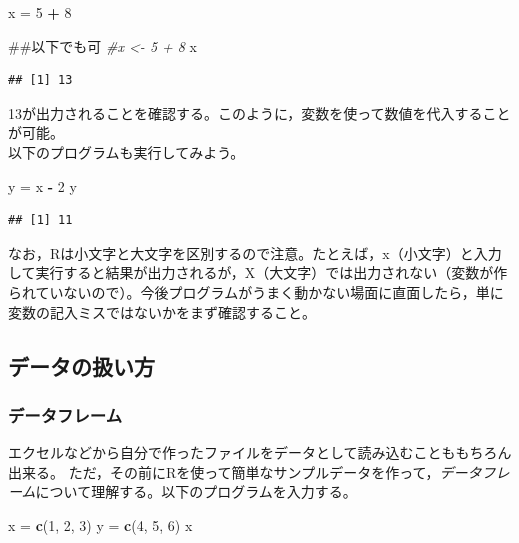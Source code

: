 \documentclass[]{article}
\newenvironment{Shaded}{\begin{snugshade}}{\end{snugshade}}
\newcommand{\KeywordTok}[1]{\textcolor[rgb]{0.13,0.29,0.53}{\textbf{#1}}}
\newcommand{\DecValTok}[1]{\textcolor[rgb]{0.00,0.00,0.81}{#1}}
\newcommand{\StringTok}[1]{\textcolor[rgb]{0.31,0.60,0.02}{#1}}
\newcommand{\CommentTok}[1]{\textcolor[rgb]{0.56,0.35,0.01}{\textit{#1}}}
\newcommand{\OperatorTok}[1]{\textcolor[rgb]{0.81,0.36,0.00}{\textbf{#1}}}
\newcommand{\NormalTok}[1]{#1}
\begin{document}
\begin{Shaded}
\begin{Highlighting}[]
\NormalTok{x =}\StringTok{ }\DecValTok{5} \OperatorTok{+}\StringTok{ }\DecValTok{8}

\NormalTok{##以下でも可}
\CommentTok{#x <- 5 + 8}
\NormalTok{x}
\end{Highlighting}
\end{Shaded}

\begin{verbatim}
## [1] 13
\end{verbatim}

13が出力されることを確認する。このように，変数を使って数値を代入することが可能。\\
以下のプログラムも実行してみよう。

\begin{Shaded}
\begin{Highlighting}[]
\NormalTok{y =}\StringTok{ }\NormalTok{x }\OperatorTok{-}\StringTok{ }\DecValTok{2}
\NormalTok{y}
\end{Highlighting}
\end{Shaded}

\begin{verbatim}
## [1] 11
\end{verbatim}

なお，Rは小文字と大文字を区別するので注意。たとえば，x（小文字）と入力して実行すると結果が出力されるが，X（大文字）では出力されない（変数が作られていないので）。今後プログラムがうまく動かない場面に直面したら，単に変数の記入ミスではないかをまず確認すること。

\subsection{データの扱い方}

\subsubsection{データフレーム}

エクセルなどから自分で作ったファイルをデータとして読み込むことももちろん出来る。
ただ，その前にRを使って簡単なサンプルデータを作って，\emph{データフレーム}について理解する。以下のプログラムを入力する。

\begin{Shaded}
\begin{Highlighting}[]
\NormalTok{x =}\StringTok{ }\KeywordTok{c}\NormalTok{(}\DecValTok{1}\NormalTok{, }\DecValTok{2}\NormalTok{, }\DecValTok{3}\NormalTok{)}
\NormalTok{y =}\StringTok{ }\KeywordTok{c}\NormalTok{(}\DecValTok{4}\NormalTok{, }\DecValTok{5}\NormalTok{, }\DecValTok{6}\NormalTok{)}
\NormalTok{x}
\end{Highlighting}
\end{Shaded}
\end{document}
